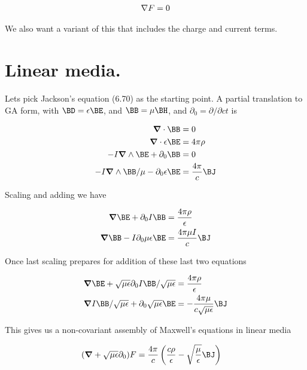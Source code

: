 \begin{align}\label{eqn:foo3}
\nabla F = 0
\end{align}

We also want a variant of this that includes the charge and current terms.

\section{Linear media.}

Lets pick Jackson's equation (6.70) as the starting point.  A partial translation to GA form, with $\BD = \epsilon \BE$, and $\BB = \mu \BH$, and $\partial_0 = \partial/\partial ct$ is

\begin{align}\label{eqn:foo4}
\spacegrad \cdot \BB &= 0 \\
\spacegrad \cdot \epsilon \BE &= 4 \pi \rho \\
-I \spacegrad \wedge \BE + \partial_0 \BB &= 0 \\
-I \spacegrad \wedge \BB/\mu - \partial_0 \epsilon \BE &= \frac{4 \pi}{c} \BJ
\end{align}

Scaling and adding we have

\begin{align}\label{eqn:foo5}
\spacegrad \BE + \partial_0 I \BB &= \frac{4 \pi \rho}{\epsilon} \\
\spacegrad \BB - I \partial_0 \mu \epsilon \BE &= \frac{4 \pi \mu I}{c} \BJ
\end{align}

Once last scaling prepares for addition of these last two equations

\begin{align}\label{eqn:foo6}
\spacegrad \BE + \sqrt{\mu\epsilon}\partial_0 I \BB/\sqrt{\mu\epsilon} &= \frac{4 \pi \rho}{\epsilon} \\
\spacegrad I \BB/\sqrt{\mu\epsilon} + \partial_0 \sqrt{\mu \epsilon} \BE &= -\frac{4 \pi \mu }{c\sqrt{\mu\epsilon}}\BJ
\end{align}

This gives us a non-covariant assembly of Maxwell's equations in linear media

\begin{align}\label{eqn:foo7}
(\spacegrad + \sqrt{\mu\epsilon}\partial_0) F &= \frac{4 \pi}{c} \left( \frac{c \rho}{\epsilon} - \sqrt{\frac{\mu}{\epsilon}} \BJ \right)
\end{align}

